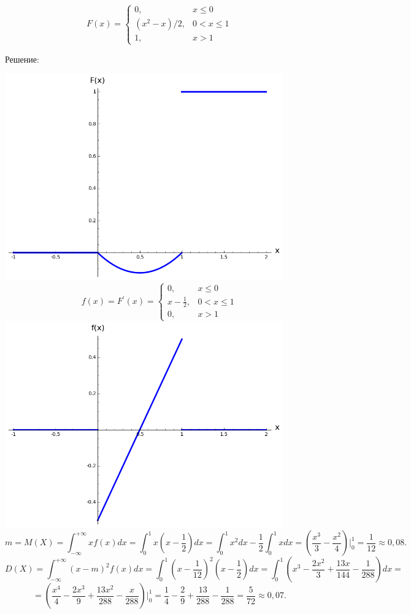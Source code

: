 \documentclass{article}
\renewcommand{\leq}{\ensuremath{\leqslant}}
\begin{document}
\begin{enumerate}
\begin{equation*}
F(x) =
 \begin{cases}
  0, & x\leq0\\
  (x^2-x)/2, & 0<x\leq1\\
  1, & x>1
 \end{cases}
\end{equation*}
\begin{center}Решение:\end{center}
\includegraphics[width=340pt,natwidth=784,natheight=581]{2_6_1.png}
\begin{equation*}
f(x) = F^{\prime}(x) =
 \begin{cases}
  0, & x\leq0\\
  x-\frac{1}{2}, & 0<x\leq1\\
  0, & x>1
 \end{cases}
\end{equation*}
\includegraphics[width=340pt,natwidth=784,natheight=581]{2_6_2.png}
$$m=M(X)=\int_{-\infty}^{+\infty} x f(x) dx=\int_{0}^{1} x\left(x-\frac{1}{2}\right) dx=\int_{0}^{1} x^2dx - \frac{1}{2}\int_{0}^{1} xdx=\left(\frac{x^3}{3}-\frac{x^2}{4}\right)\bigg|_{0}^{1}=\frac{1}{12}\approx0,08.$$
$$D(X)=\int_{-\infty}^{+\infty} (x-m)^2 f(x) dx=\int_{0}^{1} \left(x-\frac{1}{12}\right)^2\left(x-\frac{1}{2}\right) dx=\int_{0}^{1} \left(x^3-\frac{2x^2}{3}+\frac{13x}{144}-\frac{1}{288}\right) dx=$$
$$=\left(\frac{x^4}{4}-\frac{2x^3}{9}+\frac{13x^2}{288}-\frac{x}{288}\right)\bigg|_{0}^{1}=\frac{1}{4}-\frac{2}{9}+\frac{13}{288}-\frac{1}{288}=\frac{5}{72}\approx0,07.$$




\end{enumerate}
\end{document}
